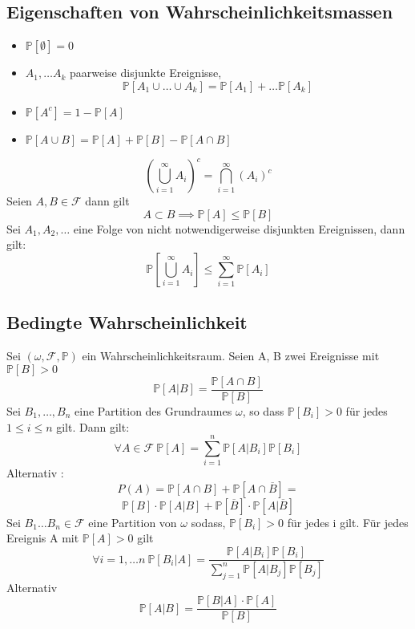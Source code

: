 \subsection{Eigenschaften von Wahrscheinlichkeitsmassen}
\Satz[1.7]
\begin{itemize}
    \item \( \mathbb{P}[\emptyset] = 0\)
    \item \(A_1, \dots A_k\) paarweise disjunkte Ereignisse, \[\mathbb{P}[A_1 \cup \dots \cup A_k] = \mathbb{P}[A_1] + \dots \mathbb{P}[A_k]\]
    \item \( \mathbb{P}[A^c] = 1 - \mathbb{P}[A]\)
    \item \(\mathbb{P}[A \cup B ] = \mathbb{P}[A] + \mathbb{P}[B] - \mathbb{P}[A \cap B]\)
\end{itemize}
\Bem[1.6A] \newline
\[\left(\bigcup_{i=1}^{\infty}A_i\right)^c = \bigcap_{i=1}^{\infty}(A_i)^c\]
\Satz[1.8] Seien \(A,B \in \mathcal{F}\) dann gilt \[ A \subset B \implies \mathbb{P}[A] \leq \mathbb{P}[B]\]
\Satz[1.9] Sei \( A_1, A_2, \dots \) eine Folge von nicht notwendigerweise disjunkten Ereignissen, dann gilt: \[ \mathbb{P}[\bigcup_{i=1}^{\infty} A_i] \leq \sum_{i=1}^{\infty} \mathbb{P}[A_i]\]
\newline \newline \newline
\subsection{Bedingte Wahrscheinlichkeit}
 \newline
Sei \((\omega, \mathcal{F}, \mathbb{P})\) ein Wahrscheinlichkeitsraum. Seien A, B zwei Ereignisse mit \( \mathbb{P}[B] > 0\) \[\mathbb{P}[A|B] = \frac{\mathbb{P}\left[A \cap B\right]}{\mathbb{P}\left[B\right]}\]
 \newline
Sei  \( B_1, \dots , B_n\) eine Partition des Grundraumes \( \omega \), so dass \( \mathbb{P}[B_i] > 0 \) für jedes \( 1 \leq i \leq n\) gilt. Dann gilt: \[\forall A \in  \mathcal{F} \ \mathbb{P}[A] = \sum_{i=1}^{n} \mathbb{P} \left[A | B_i \right] \mathbb{P}[B_i]\]
Alternativ : \[P(A) = \mathbb{P}[A \cap B ] + \mathbb{P}[A \cap \overline{B}] = \] 
\[\mathbb{P}[B] \cdot \mathbb{P}[A|B] + \mathbb{P}[\overline{B}] \cdot \mathbb{P}[A|\overline{B}]\]
 \newline
Sei \( B_1 \dots B_n \in \mathcal{F }\) eine Partition von \( \omega\) sodass, \( \mathbb{P}[B_i] > 0 \) für jedes i gilt. Für jedes Ereignis A mit \( \mathbb{P}[A] > 0 \) gilt  \[ \forall i = 1, \dots n \ \mathbb{P}\left[ B_i | A \right] = \frac{\mathbb{P}[A | B_i] \mathbb{P}[B_i]}{\sum_{j=1}^{n} \mathbb{P}[A | B_j] \mathbb{P}[B_j] }\]
Alternativ \[\mathbb{P}[A|B] = \frac{\mathbb{P}[B|A] \cdot \mathbb{P}[A]}{\mathbb{P}[B]}\]
